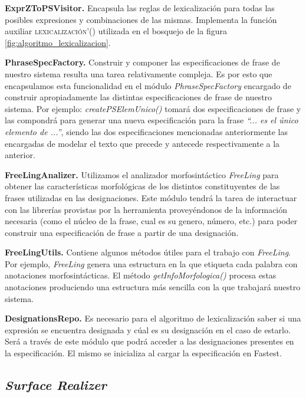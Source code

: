 \bigskip
\noindent
\textbf{ExprZToPSVisitor.} Encapsula las reglas de lexicalización para todas las posibles expresiones y combinaciones de las mismas. Implementa la función auxiliar \textsc{lexicalización'()} utilizada en el bosquejo de la figura \ref{fig:algoritmo_lexicalizacion}.

\bigskip
\noindent
\textbf{PhraseSpecFactory.} Construir y componer las especificaciones de frase de nuestro sistema resulta una tarea relativamente compleja. Es por esto que encapsulamos esta funcionalidad en el módulo \textit{PhraseSpecFactory} encargado de construir apropiadamente las distintas especificaciones de frase de nuestro sistema. Por ejemplo: \textit{createPSElemUnico()} tomará dos especificaciones de frase y las compondrá para generar una nueva especificación para la frase \textit{``... es el único elemento de ...''}, siendo las dos especificaciones mencionadas anteriormente las encargadas de modelar el texto que precede y antecede respectivamente a la anterior.

\bigskip
\noindent
\textbf{FreeLingAnalizer.} Utilizamos el analizador morfosintáctico \textit{FreeLing} para obtener las características morfológicas de los distintos constituyentes de las frases utilizadas en las designaciones. Este módulo tendrá la tarea de interactuar con las librerías provistas por la herramienta proveyéndonos de la información necesaria (como el núcleo de la frase, cual es su genero, número, etc.) para poder construir una especificación de frase a partir de una designación.

\bigskip
\noindent
\textbf{FreeLingUtils.} Contiene algunos métodos útiles para el trabajo con \textit{FreeLing}. Por ejemplo, \textit{FreeLing} genera una estructura en la que etiqueta cada palabra con anotaciones morfosintácticas. El método \textit{getInfoMorfologica()} procesa estas anotaciones produciendo una estructura más sencilla con la que trabajará nuestro sistema.

\bigskip
\noindent
\textbf{DesignationsRepo.} Es necesario para el algoritmo de lexicalización saber si una expresión se encuentra designada y cúal es su designación en el caso de estarlo. Será a través de este módulo que podrá acceder a las designaciones presentes en la especificación. El mismo se inicializa al cargar la especificación en Fastest. 

\subsection{\textit{Surface Realizer}}

